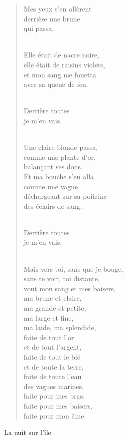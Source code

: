 \documentclass[11pt,a4paper]{book}
\begin{document}
\begin{verse}
Mes yeux s'en allèrent \\
derrière une brune \\
qui passa. \\ \

Elle était de nacre noire, \\
elle était de raisins violets, \\
et mon sang me fouetta \\
avec sa queue de feu. \\ \

Derrière toutes \\
je m'en vais. \\ \

Une claire blonde passa, \\
comme une plante d'or, \\
balan\c{c}ant ses dons. \\
Et ma bouche s'en alla \\
comme une vague \\
déchargeant sur sa poitrine \\
des éclairs de sang. \\ \

Derrière toutes \\
je m'en vais. \\ \

Mais vers toi, sans que je bouge, \\
sans te voir, toi distante, \\
vont mon sang et mes baisers, \\
ma brune et claire, \\
ma grande et petite, \\
ma large et fine, \\
ma laide, ma splendide, \\
faite de tout l'or \\
et de tout l'argent, \\
faite de tout le blé \\
et de toute la terre, \\
faite de toute l'eau \\
des vagues marines, \\
faite pour mes bras, \\
faite pour mes baisers, \\
faite pour mon âme.
\end{verse}

\newpage

{\huge La nuit sur l'île} \\ \\
\end{document}
